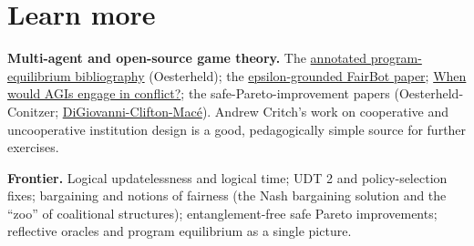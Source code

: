 \documentclass[11pt]{article}
\begin{document}
\section{Learn more}
\textbf{Multi-agent and open-source game theory.} The \href{https://www.andrew.cmu.edu/user/coesterh/AnnotatedProgEqBibliography.html}{annotated program-equilibrium bibliography} (Oesterheld); the \href{https://arxiv.org/abs/2412.14570}{epsilon-grounded FairBot paper}; \href{https://www.lesswrong.com/posts/cLDcKgvM6KxBhqhGq/when-would-agis-engage-in-conflict}{When would AGIs engage in conflict?}; the safe-Pareto-improvement papers (Oesterheld-Conitzer; \href{https://arxiv.org/abs/2403.05103}{DiGiovanni-Clifton-Macé}). Andrew Critch's work on cooperative and uncooperative institution design is a good, pedagogically simple source for further exercises.

\textbf{Frontier.} Logical updatelessness and logical time; UDT 2 and policy-selection fixes; bargaining and notions of fairness (the Nash bargaining solution and the ``zoo'' of coalitional structures); entanglement-free safe Pareto improvements; reflective oracles and program equilibrium as a single picture.
\end{document}
